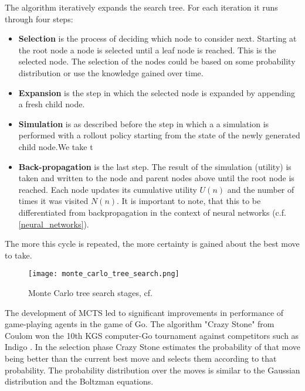 The algorithm iteratively expands the search tree. For each iteration it runs through four steps:
\begin{itemize}
    \item \textbf{Selection} is the process of deciding which node to consider next. Starting at the root node a node is selected until a leaf node is reached. This is the selected node. The selection of the nodes could be based on some probability distribution or use the knowledge gained over time.

    \item \textbf{Expansion} is the step in which the selected node is expanded by appending a fresh child node.

    \item \textbf{Simulation} is as described before the step in which a a simulation is performed with a rollout policy starting from the state of the newly generated child node.We take t

    \item \textbf{Back-propagation} is the last step. The result of the simulation (utility) is taken and written to the node and parent nodes above until the root node is reached. Each node updates its cumulative utility $U(n)$ and the number of times it was visited $N(n)$. It is important to note, that this to be differentiated from backpropagation in the context of neural networks (c.f. \ref{neural_networks}).
\end{itemize}

The more this cycle is repeated, the more certainty is gained about the best move to take.

\begin{figure}
    \centering
    \texttt{[image: monte\_carlo\_tree\_search.png]}
    \caption{Monte Carlo tree search stages, cf. \cite{noauthor_fig_nodate}}
    \label{monte_carlo_tree_search}
\end{figure}

The development of MCTS led to significant improvements in performance of game-playing agents in the game of Go. The algorithm "Crazy Stone" from Coulom won the 10th KGS computer-Go tournament against competitors such as Indigo \cite{bouzy_associating_2006}. In the selection phase Crazy Stone estimates the probability of that move being better than the current best move and selects them according to that probability. The probability distribution over the moves is similar to the Gaussian distribution and the Boltzman equations. \cite[p. 4]{coulom_efficient_2007}

